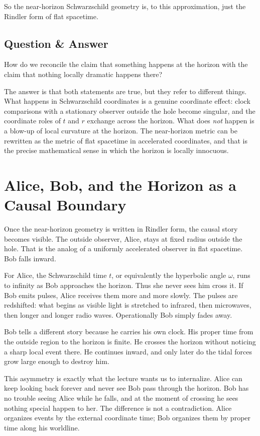 So the near-horizon Schwarzschild geometry is, to this approximation, just the Rindler form of flat spacetime.

\subsection{Question \& Answer}

How do we reconcile the claim that something happens at the horizon with the claim that nothing locally dramatic happens there?

The answer is that both statements are true, but they refer to different things. What happens in Schwarzschild coordinates is a genuine coordinate effect: clock comparisons with a stationary observer outside the hole become singular, and the coordinate roles of \(t\) and \(r\) exchange across the horizon. What does \emph{not} happen is a blow-up of local curvature at the horizon. The near-horizon metric can be rewritten as the metric of flat spacetime in accelerated coordinates, and that is the precise mathematical sense in which the horizon is locally innocuous.

\section{Alice, Bob, and the Horizon as a Causal Boundary}

Once the near-horizon geometry is written in Rindler form, the causal story becomes visible. The outside observer, Alice, stays at fixed radius outside the hole. That is the analog of a uniformly accelerated observer in flat spacetime. Bob falls inward.

For Alice, the Schwarzschild time \(t\), or equivalently the hyperbolic angle \(\omega\), runs to infinity as Bob approaches the horizon. Thus she never sees him cross it. If Bob emits pulses, Alice receives them more and more slowly. The pulses are redshifted: what begins as visible light is stretched to infrared, then microwaves, then longer and longer radio waves. Operationally Bob simply fades away.

Bob tells a different story because he carries his own clock. His proper time from the outside region to the horizon is finite. He crosses the horizon without noticing a sharp local event there. He continues inward, and only later do the tidal forces grow large enough to destroy him.

This asymmetry is exactly what the lecture wants us to internalize. Alice can keep looking back forever and never see Bob pass through the horizon. Bob has no trouble seeing Alice while he falls, and at the moment of crossing he sees nothing special happen to her. The difference is not a contradiction. Alice organizes events by the external coordinate time; Bob organizes them by proper time along his worldline.

